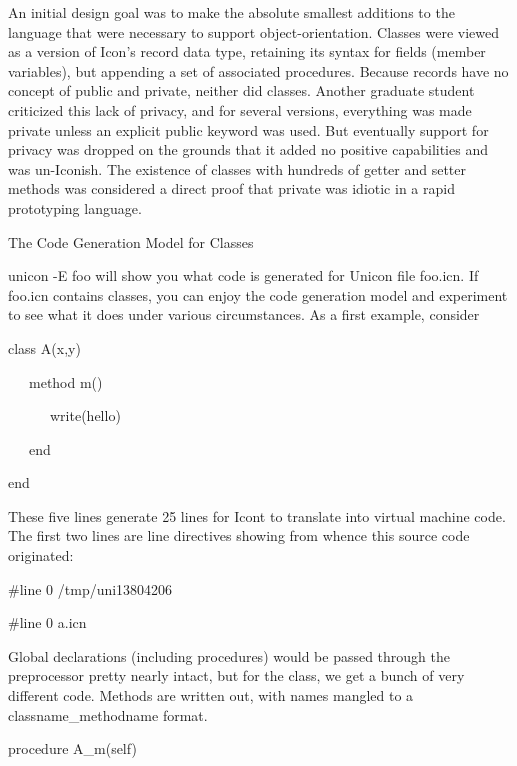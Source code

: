 An initial design goal was to make the absolute smallest additions to
the language that were necessary to support
object-orientation. Classes were viewed as a version of Icon's record
data type, retaining its syntax for fields (member variables), but
appending a set of associated procedures. Because records have no
concept of public and private, neither did classes. Another graduate
student criticized this lack of privacy, and for several versions,
everything was made private unless an explicit public keyword was
used. But eventually support for privacy was dropped on the grounds
that it added no positive capabilities and was un-Iconish. The
existence of classes with hundreds of
{\textquotedbl}getter{\textquotedbl} and
{\textquotedbl}setter{\textquotedbl} methods was considered a direct
proof that {\textquotedbl}private{\textquotedbl} was idiotic in a
rapid prototyping language.

{\sffamily
The Code Generation Model for Classes }


{\textquotedbl}unicon -E foo{\textquotedbl} will show you what code is
generated for Unicon file foo.icn. If foo.icn contains classes, you
can enjoy the code generation model and experiment to see what it does
under various circumstances. As a first example, consider

{\ttfamily\mdseries
class A(x,y)}

{\ttfamily\mdseries
\ \ \ method m()}

{\ttfamily\mdseries
\ \ \ \ \ \ write({\textquotedbl}hello{\textquotedbl})}

{\ttfamily\mdseries
\ \ \ end}

{\ttfamily\mdseries
end}


These five lines generate 25 lines for Icont to translate into virtual
machine code. The first two lines are line directives showing from
whence this source code originated:

{\ttfamily\mdseries
\#line 0 {\textquotedbl}/tmp/uni13804206{\textquotedbl}}

{\ttfamily\mdseries
\#line 0 {\textquotedbl}a.icn{\textquotedbl}}


Global declarations (including procedures) would be passed through the
preprocessor pretty nearly intact, but for the class, we get a bunch
of very different code. Methods are written out, with names mangled to
a classname\_methodname format.

{\ttfamily\mdseries
procedure A\_m(self)}


\bigskip


